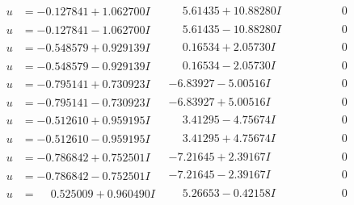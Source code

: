 \documentclass[1p]{elsarticle_modified}
\theoremstyle{definition}
\begin{document}
$$\begin{array}{c|c|c}
\begin{aligned}
u &= -0.127841 + 1.062700 I\end{aligned}
 & \phantom{-}5.61435 + 10.88280 I & \phantom{-0.000000 } 0 \\ \hline\begin{aligned}
u &= -0.127841 - 1.062700 I\end{aligned}
 & \phantom{-}5.61435 - 10.88280 I & \phantom{-0.000000 } 0 \\ \hline\begin{aligned}
u &= -0.548579 + 0.929139 I\end{aligned}
 & \phantom{-}0.16534 + 2.05730 I & \phantom{-0.000000 } 0 \\ \hline\begin{aligned}
u &= -0.548579 - 0.929139 I\end{aligned}
 & \phantom{-}0.16534 - 2.05730 I & \phantom{-0.000000 } 0 \\ \hline\begin{aligned}
u &= -0.795141 + 0.730923 I\end{aligned}
 & -6.83927 - 5.00516 I & \phantom{-0.000000 } 0 \\ \hline\begin{aligned}
u &= -0.795141 - 0.730923 I\end{aligned}
 & -6.83927 + 5.00516 I & \phantom{-0.000000 } 0 \\ \hline\begin{aligned}
u &= -0.512610 + 0.959195 I\end{aligned}
 & \phantom{-}3.41295 - 4.75674 I & \phantom{-0.000000 } 0 \\ \hline\begin{aligned}
u &= -0.512610 - 0.959195 I\end{aligned}
 & \phantom{-}3.41295 + 4.75674 I & \phantom{-0.000000 } 0 \\ \hline\begin{aligned}
u &= -0.786842 + 0.752501 I\end{aligned}
 & -7.21645 + 2.39167 I & \phantom{-0.000000 } 0 \\ \hline\begin{aligned}
u &= -0.786842 - 0.752501 I\end{aligned}
 & -7.21645 - 2.39167 I & \phantom{-0.000000 } 0 \\ \hline\begin{aligned}
u &= \phantom{-}0.525009 + 0.960490 I\end{aligned}
 & \phantom{-}5.26653 - 0.42158 I & \phantom{-0.000000 } 0 \\ \hline\begin{aligned}

\end{aligned}
\end{array}$$
\end{document}
